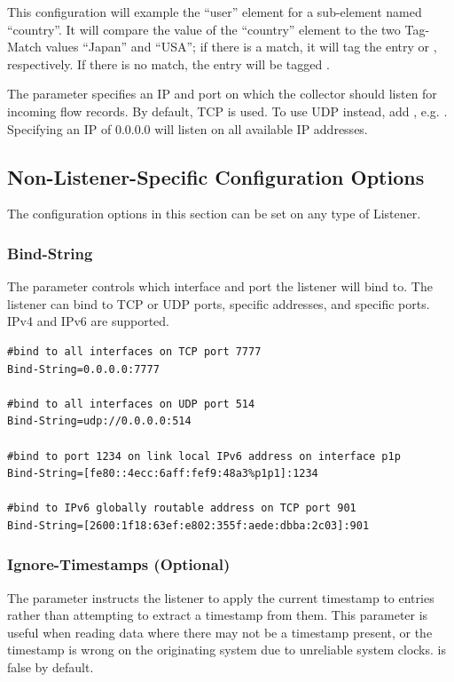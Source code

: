 This configuration will example the ``user'' element for a sub-element
named ``country''. It will compare the value of the ``country''
element to the two Tag-Match values ``Japan'' and ``USA''; if there is a
match, it will tag the entry  or ,
respectively. If there is no match, the entry will be tagged
.

The  parameter specifies an IP and port on which
the collector should listen for incoming flow records. By default, TCP is used.
To use UDP instead, add , e.g. .
Specifying an IP of 0.0.0.0 will listen on all available IP addresses.

\subsection{Non-Listener-Specific Configuration Options}

The configuration options in this section can be set on any type of
Listener.

\subsubsection*{Bind-String}

The  parameter controls which interface and port the
listener will bind to. The listener can bind to TCP or UDP ports,
specific addresses, and specific ports. IPv4 and IPv6 are supported.

\begin{Verbatim}[breaklines=true]
#bind to all interfaces on TCP port 7777
Bind-String=0.0.0.0:7777

#bind to all interfaces on UDP port 514
Bind-String=udp://0.0.0.0:514

#bind to port 1234 on link local IPv6 address on interface p1p
Bind-String=[fe80::4ecc:6aff:fef9:48a3%p1p1]:1234

#bind to IPv6 globally routable address on TCP port 901
Bind-String=[2600:1f18:63ef:e802:355f:aede:dbba:2c03]:901
\end{Verbatim}

\subsubsection*{Ignore-Timestamps (Optional)}

The  parameter instructs the listener to apply the
current timestamp to entries rather than attempting to extract a
timestamp from them. This parameter is useful when reading data where
there may not be a timestamp present, or the timestamp is wrong on the
originating system due to unreliable system clocks.
 is false by default.

